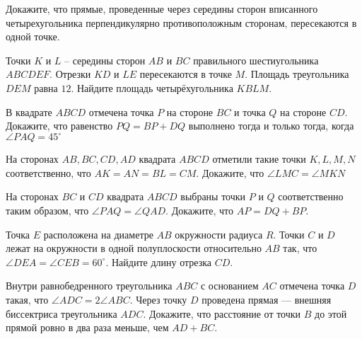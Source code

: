 \documentclass{article}
\begin{document}
\begin{enumerate_boxed}
        \item Докажите, что прямые, проведенные через середины сторон вписанного четырехугольника перпендикулярно противоположным сторонам, пересекаются в одной точке.

        \item Точки $K$ и $L$ – середины сторон $AB$ и $BC$ правильного шестиугольника $ABCDEF$.
        Отрезки $KD$ и $LE$ пересекаются в точке $M$.
        Площадь треугольника $DEM$ равна $12$.
        Найдите площадь четырёхугольника $KBLM$.

        \item В квадрате $ABCD$ отмечена точка $P$ на стороне $BC$ и точка $Q$ на стороне $CD$.
        Докажите, что равенство $PQ = BP + DQ$ выполнено тогда и только тогда, когда $\angle PAQ = 45^\circ$

        \item На сторонах $AB, BC, CD, AD$ квадрата $ABCD$ отметили такие точки $K, L, M, N$ соответственно, что $AK=AN=BL=CM$.
        Докажите, что $\angle LMC= \angle MKN$

        \item На сторонах $BC$ и $CD$ квадрата $ABCD$ выбраны точки $P$ и $Q$ соответственно таким образом, что $\angle PAQ= \angle QAD$.
        Докажите, что $AP=DQ+BP$.

        \item Точка $E$ расположена на диаметре $AB$ окружности радиуса $R$.
        Точки $C$ и $D$ лежат на окружности в одной полуплоскости относительно $AB$ так, что $\angle DEA=\angle CEB=60^\circ.$ Найдите длину отрезка $CD$.

        \item Внутри равнобедренного треугольника $ABC$ с основанием $AC$ отмечена точка $D$ такая, что $\angle ADC=2\angle ABC$.
        Через точку $D$ проведена прямая — внешняя биссектриса треугольника $ADC$.
        Докажите, что расстояние от точки $B$ до этой прямой ровно в два раза меньше, чем $AD+BC$.

    \end{enumerate_boxed}
\end{document}
